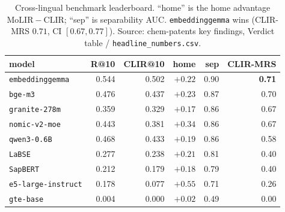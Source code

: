 \documentclass[11pt]{article}
\begin{document}
\begin{table}[t]
  \centering
  \small
  \begin{tabular}{lrrrrr}
    \toprule
    model & R@10 & CLIR@10 & home & sep & CLIR-MRS \\
    \midrule
    \texttt{embeddinggemma} & 0.544 & 0.502 & $+0.22$ & 0.90 & \textbf{0.71} \\
    \texttt{bge-m3}         & 0.476 & 0.437 & $+0.23$ & 0.87 & 0.70 \\
    \texttt{granite-278m}   & 0.359 & 0.329 & $+0.17$ & 0.86 & 0.67 \\
    \texttt{nomic-v2-moe}   & 0.443 & 0.381 & $+0.34$ & 0.86 & 0.67 \\
    \texttt{qwen3-0.6B}     & 0.468 & 0.433 & $+0.19$ & 0.86 & 0.58 \\
    \texttt{LaBSE}          & 0.277 & 0.238 & $+0.21$ & 0.81 & 0.40 \\
    \texttt{SapBERT}        & 0.212 & 0.179 & $+0.18$ & 0.79 & 0.40 \\
    \texttt{e5-large-instruct} & 0.178 & 0.077 & $+0.55$ & 0.71 & 0.26 \\
    \texttt{gte-base}       & 0.004 & 0.000 & $+0.02$ & 0.49 & 0.00 \\
    \bottomrule
  \end{tabular}
  \caption{Cross-lingual benchmark leaderboard. ``home'' is the home advantage
  $\mathrm{MoLIR}{-}\mathrm{CLIR}$; ``sep'' is separability AUC.
  \texttt{embeddinggemma} wins (CLIR-MRS $0.71$, CI $[0.67,0.77]$).
  Source: chem-patents key findings, Verdict table / \texttt{headline\_numbers.csv}.}
  \label{tab:cp_board}
\end{table}
\end{document}
